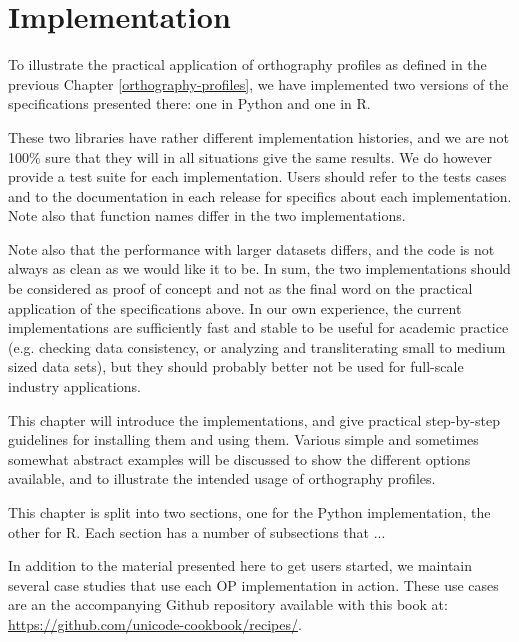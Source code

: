 \chapter{Implementation}
\label{implementation}

To illustrate the practical application of orthography profiles as defined in
the previous Chapter \ref{orthography-profiles}, we have implemented two 
versions of the specifications presented there: one in Python and one
in R.

These two libraries have rather different implementation histories,
and we are not 100\% sure that they will in all situations give the same
results. We do however provide a test suite for each implementation. 
Users should refer to the tests cases and to the documentation in each release 
for specifics about each implementation. Note also that function names differ 
in the two implementations.

Note also that the performance with larger datasets differs, and the code is not
always as clean as we would like it to be. In sum, the two implementations
should be considered as proof of concept and not as the final word on the
practical application of the specifications above. In our own experience, the
current implementations are sufficiently fast and stable to be useful for
academic practice (e.g. checking data consistency, or analyzing and
transliterating small to medium sized data sets), but they should probably
better not be used for full-scale industry applications.

This chapter will introduce the implementations, and give practical step-by-step 
guidelines for installing them and using them. Various simple and sometimes 
somewhat abstract examples will be discussed to show the different options 
available, and to illustrate the intended usage of orthography profiles. 

This chapter is split into two sections, one for the Python implementation, the 
other for R. Each section has a number of subsections that ...

In addition to the material presented here to get users started, we maintain 
several case studies that use each OP implementation in action. These use cases 
are an the accompanying Github repository available with this book at: 
\url{https://github.com/unicode-cookbook/recipes/}.



